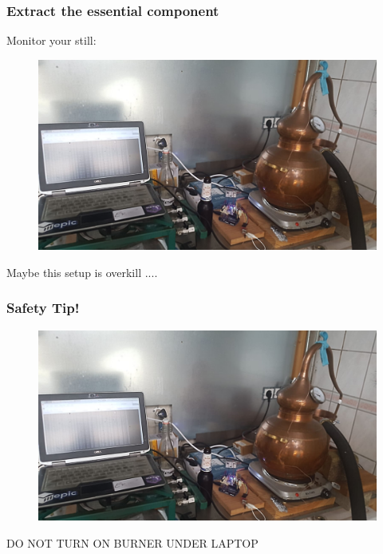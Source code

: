 \documentclass{beamer}
\begin{document}
\begin{frame}
\frametitle{Extract the essential component}
Monitor your still:
\begin{figure}
\includegraphics[width=\textwidth]{images/still-wizardry.jpeg}
\end{figure}
Maybe this setup is overkill ....
\end{frame}

\begin{frame}
\frametitle{Safety Tip!}
\begin{figure}
\includegraphics[width=\textwidth]{images/still-wizardry.jpeg}
\end{figure}
\huge{DO NOT TURN ON BURNER UNDER LAPTOP}
\end{frame}
\end{document}
